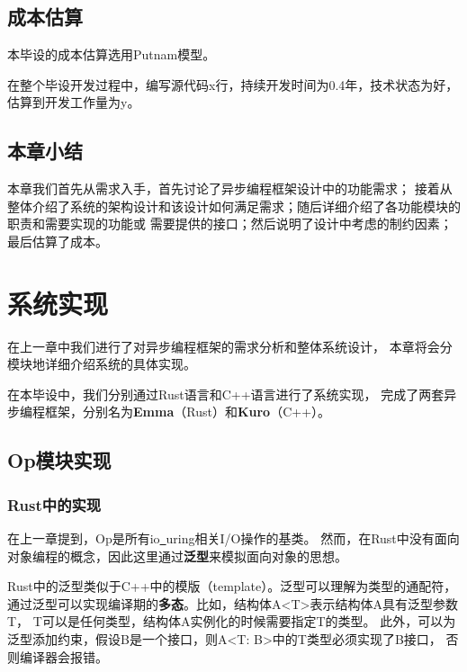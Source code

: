 \documentclass[supercite]{HustGraduPaper}
\theoremstyle{definition}
\begin{document}
\subsection{成本估算}

本毕设的成本估算选用Putnam模型。\par

在整个毕设开发过程中，编写源代码x行，持续开发时间为0.4年，技术状态为好，
估算到开发工作量为y。\par

\subsection{本章小结}

本章我们首先从需求入手，首先讨论了异步编程框架设计中的功能需求；
接着从整体介绍了系统的架构设计和该设计如何满足需求；随后详细介绍了各功能模块的职责和需要实现的功能或
需要提供的接口；然后说明了设计中考虑的制约因素；最后估算了成本。\par

\section{系统实现}

在上一章中我们进行了对异步编程框架的需求分析和整体系统设计，
本章将会分模块地详细介绍系统的具体实现。\par

在本毕设中，我们分别通过Rust语言和C++语言进行了系统实现，
完成了两套异步编程框架，分别名为\textbf{Emma}（Rust）和\textbf{Kuro}（C++）。\par

\subsection{Op模块实现}
\subsubsection{Rust中的实现}
在上一章提到，Op是所有io\underline{~}uring相关I/O操作的基类。
然而，在Rust中没有面向对象编程的概念，因此这里通过\textbf{泛型}来模拟面向对象的思想。\par

Rust中的泛型类似于C++中的模版（template）。泛型可以理解为类型的通配符，
通过泛型可以实现编译期的\textbf{多态}。比如，结构体A<T>表示结构体A具有泛型参数T，
T可以是任何类型，结构体A实例化的时候需要指定T的类型。
此外，可以为泛型添加约束，假设B是一个接口，则A<T: B>中的T类型必须实现了B接口，
否则编译器会报错。\par
\end{document}
